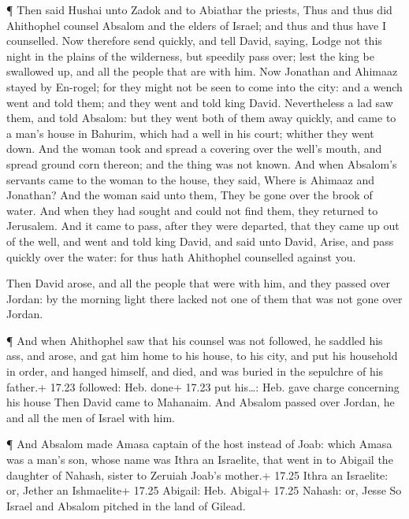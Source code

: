  ¶ Then said Hushai unto Zadok and to Abiathar the priests,
Thus and thus did Ahithophel counsel Absalom and the elders of Israel;
and thus and thus have I counselled.  Now therefore send
quickly, and tell David, saying, Lodge not this night in the plains of
the wilderness, but speedily pass over; lest the king be swallowed up,
and all the people that are with him.  Now Jonathan and
Ahimaaz stayed by En-rogel; for they might not be seen to come into the
city: and a wench went and told them; and they went and told king David.
 Nevertheless a lad saw them, and told Absalom: but they
went both of them away quickly, and came to a man's house in Bahurim,
which had a well in his court; whither they went down.  And
the woman took and spread a covering over the well's mouth, and spread
ground corn thereon; and the thing was not known.  And when
Absalom's servants came to the woman to the house, they said, Where is
Ahimaaz and Jonathan? And the woman said unto them, They be gone over
the brook of water. And when they had sought and could not find them,
they returned to Jerusalem.  And it came to pass, after
they were departed, that they came up out of the well, and went and told
king David, and said unto David, Arise, and pass quickly over the water:
for thus hath Ahithophel counselled against you.

 Then David arose, and all the people that were with him,
and they passed over Jordan: by the morning light there lacked not one
of them that was not gone over Jordan.

 ¶ And when Ahithophel saw that his counsel was not
followed, he saddled his ass, and arose, and gat him home to his house,
to his city, and put his household in order, and hanged himself, and
died, and was buried in the sepulchre of his father.+ 17.23 followed:
Heb. done+ 17.23 put his\ldots: Heb. gave charge concerning his house
 Then David came to Mahanaim. And Absalom passed over
Jordan, he and all the men of Israel with him.

 ¶ And Absalom made Amasa captain of the host instead of
Joab: which Amasa was a man's son, whose name was Ithra an Israelite,
that went in to Abigail the daughter of Nahash, sister to Zeruiah Joab's
mother.+ 17.25 Ithra an Israelite: or, Jether an Ishmaelite+ 17.25
Abigail: Heb. Abigal+ 17.25 Nahash: or, Jesse  So Israel
and Absalom pitched in the land of Gilead.

